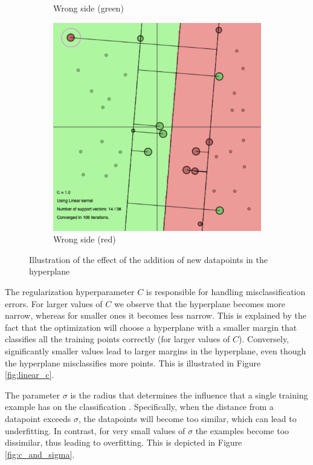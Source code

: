 \documentclass[a4paper, 11pt, one column]{article}
\begin{document}
\begin{figure}[]
\begin{subfigure}{0.33\linewidth}
            \caption{Wrong side (green)}
        \end{subfigure}
        \begin{subfigure}{0.33\linewidth}
            \includegraphics[width=\linewidth]{images/lin_wrong_red.png}
            \caption{Wrong side (red)}
        \end{subfigure}
  
        \caption{Illustration of the effect of the addition of new datapoints in the hyperplane}
        
        \label{fig:svm_addition_side}
\end{figure}

The regularization hyperparameter $C$ is responsible for handling misclassification errors. For larger values of $C$ we observe that the hyperplane becomes more narrow, whereas for smaller ones it becomes less narrow. This is explained by the fact that the optimization will choose a hyperplane with a smaller margin that classifies all the training points correctly (for larger values of $C$). Conversely, significantly smaller values lead to larger margins in the hyperplane, even though the hyperplane misclassifies more points. This is illustrated in Figure \ref{fig:linear_c}.

The parameter $\sigma$ is the radius that determines the influence that a single training example has on the classification . Specifically, when the distance from a datapoint exceeds $\sigma$, the datapoints will become too similar, which can lead to underfitting. In contrast, for very small values of $\sigma$ the examples become too dissimilar, thus leading to overfitting. This is depicted in Figure \ref{fig:c_and_sigma}. 
\end{document}
